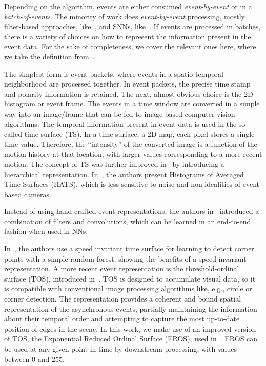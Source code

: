 Depending on the algorithm, events are either consumed \textit{event-by-event} or in a \textit{batch-of-events}.
%
The minority of work does \textit{event-by-event} processing, mostly filter-based approaches, like~\cite{Scheerlinck2019accv}, and \acp{SNN}, like~\cite{Seifozzakerini2016bmcv}.
%
If events are processed in batches, there is a variety of choices on how to represent the information present in the event data.
%
For the sake of completeness, we cover the relevant ones here, where we take the definition from~\cite{Gallego2020pami}.

The simplest form is event packets, where events in a spatio-temporal neighborhood are processed together.
%
In event packets, the precise time stamp and polarity information is retained.
%
The next, almost obvious choice is the 2D histogram or event frame.
%
The events in a time window are converted in a simple way into an image/frame that can be fed to image-based computer vision algorithms.
%
The temporal information present in event data is used in the so-called time surface (TS).
%
In a time surface, a 2D map, each pixel stores a single time value.
%
Therefore, the ``intensity'' of the converted image is a function of the motion history at that location, with larger values corresponding to a more recent motion.
%
The concept of TS was further improved in~\cite{Lagorce2017pami} by introducing a hierarchical representation.
%
In~\cite{Sironi2018cvpr}, the authors present Histograms of Averaged Time Surfaces (HATS), which is less sensitive to noise and non-idealities of event-based cameras.

Instead of using hand-crafted event representations, the authors in~\cite{Gehrig2019iccv} introduced a combination of filters and convolutions, which can be learned in an end-to-end fashion when used in \acp{NN}.

In~\cite{Manderscheid2019cvpr}, the authors use a speed invariant time surface for learning to detect corner points with a simple random forest, showing the benefits of a speed invariant representation.
%
A more recent event representation is the threshold-ordinal surface (TOS), introduced in~\cite{Glover2022pami}.
%
TOS is designed to accumulate visual data, so it is compatible with conventional image processing algorithms like, e.g., circle or corner detection.
%
The representation provides a coherent and bound spatial representation of the asynchronous events, partially maintaining the information about their temporal order and attempting to capture the most up-to-date position of edges in the scene.
%
In this work, we make use of an improved version of TOS, the Exponential Reduced Ordinal Surface (EROS), used in~\cite{Glover2024icra}.
%
EROS can be used at any given point in time by downstream processing, with values between $0$ and $255$.